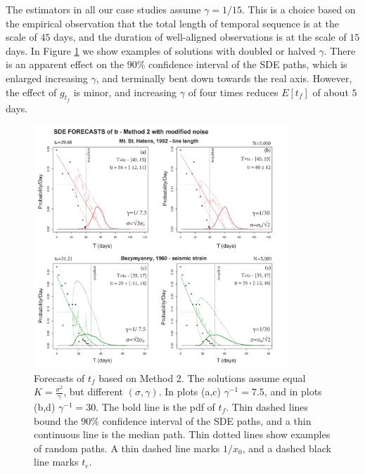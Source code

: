 \documentclass{article}
\begin{document}
The estimators in all our case studies assume $\gamma=1/15$.  This is a choice based on the empirical observation that the total length of temporal sequence is at the scale of $45$ days, and the duration of well-aligned observations is at the scale of $15$ days. In Figure \ref{Fig12} we show examples of solutions with doubled or halved $\gamma$. There is an apparent effect on the $90\%$ confidence interval of the SDE paths, which is enlarged increasing $\gamma$, and terminally bent down towards the real axis. However, the effect of $g_{t_f}$ is minor, and increasing $\gamma$ of four times reduces $E[t_f]$ of about $5$ days.

\begin{figure}[H]
\centering
\includegraphics[width=0.85\textwidth]{Fig12_plus.png}
\caption{Forecasts of $t_f$ based on Method 2. The solutions assume equal $K=\frac{\sigma^2}{\gamma}$, but different $(\sigma, \gamma)$. In plots (a,c) $\gamma^{-1}=7.5$, and in plots (b,d) $\gamma^{-1}=30$. The bold line is the pdf of $t_f$. Thin dashed lines bound the $90\%$ confidence interval of the SDE paths, and a thin continuous line is the median path. Thin dotted lines show examples of random paths. A thin dashed line marks $1/x_0$, and a dashed black line marks $t_e$.}
\label{Fig12}
\end{figure}



\end{document}
